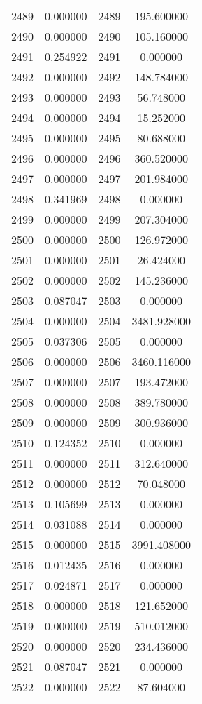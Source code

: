 \documentclass[12pt]{article}
\begin{document}
\begin{longtable}{@{}cccc@{}}
2489 & 0.000000 & 2489 & 195.600000 \\
2490 & 0.000000 & 2490 & 105.160000 \\
2491 & 0.254922 & 2491 & 0.000000 \\
2492 & 0.000000 & 2492 & 148.784000 \\
2493 & 0.000000 & 2493 & 56.748000 \\
2494 & 0.000000 & 2494 & 15.252000 \\
2495 & 0.000000 & 2495 & 80.688000 \\
2496 & 0.000000 & 2496 & 360.520000 \\
2497 & 0.000000 & 2497 & 201.984000 \\
2498 & 0.341969 & 2498 & 0.000000 \\
2499 & 0.000000 & 2499 & 207.304000 \\
2500 & 0.000000 & 2500 & 126.972000 \\
2501 & 0.000000 & 2501 & 26.424000 \\
2502 & 0.000000 & 2502 & 145.236000 \\
2503 & 0.087047 & 2503 & 0.000000 \\
2504 & 0.000000 & 2504 & 3481.928000 \\
2505 & 0.037306 & 2505 & 0.000000 \\
2506 & 0.000000 & 2506 & 3460.116000 \\
2507 & 0.000000 & 2507 & 193.472000 \\
2508 & 0.000000 & 2508 & 389.780000 \\
2509 & 0.000000 & 2509 & 300.936000 \\
2510 & 0.124352 & 2510 & 0.000000 \\
2511 & 0.000000 & 2511 & 312.640000 \\
2512 & 0.000000 & 2512 & 70.048000 \\
2513 & 0.105699 & 2513 & 0.000000 \\
2514 & 0.031088 & 2514 & 0.000000 \\
2515 & 0.000000 & 2515 & 3991.408000 \\
2516 & 0.012435 & 2516 & 0.000000 \\
2517 & 0.024871 & 2517 & 0.000000 \\
2518 & 0.000000 & 2518 & 121.652000 \\
2519 & 0.000000 & 2519 & 510.012000 \\
2520 & 0.000000 & 2520 & 234.436000 \\
2521 & 0.087047 & 2521 & 0.000000 \\
2522 & 0.000000 & 2522 & 87.604000 \\

\end{longtable}
\end{document}
